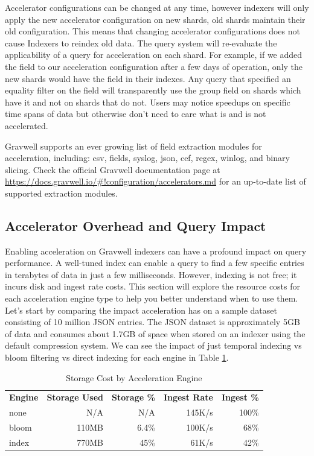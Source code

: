 {Accelerator configurations can be changed at any time, however indexers
will only apply the new accelerator configuration on new shards, old
shards maintain their old configuration. This means that changing
accelerator configurations does not cause Indexers to reindex old data.
The query system will re-evaluate the applicability of a query for
acceleration on each shard. For example, if we added the field
 to our acceleration configuration after a few days of
operation, only the new shards would have the field in their indexes.
Any query that specified an equality filter on the  field will
transparently use the group field on shards which have it and not on shards
that do not. Users may notice speedups on specific time spans of data
but otherwise don't need to care what is and is not accelerated.

Gravwell supports an ever growing list of field extraction modules for
acceleration, including: csv, fields, syslog, json, cef, regex, winlog,
and binary slicing. Check the official Gravwell documentation page at
\href{https://docs.gravwell.io/\#!configuration/accelerators.md}{https://docs.gravwell.io/\#!configuration/accelerators.md} for
an up-to-date list of supported extraction modules.

\subsection{Accelerator Overhead and Query Impact}

Enabling acceleration on Gravwell indexers can have a profound impact
on query performance. A well-tuned index can enable a query to find a
few specific entries in terabytes of data in just a few milliseconds.
However, indexing is not free; it incurs disk and ingest rate costs.
This section will explore the resource costs for each acceleration
engine type to help you better understand when to use them. Let's start
by comparing the impact acceleration has on a sample dataset consisting
of 10 million JSON entries. The JSON dataset is approximately 5GB of
data and consumes about 1.7GB of space when stored on an indexer using
the default compression system. We can see the impact of just temporal
indexing vs bloom filtering vs direct indexing for each engine in Table \ref{table:accel-storage}.

\begin{table}
\begin{tabular}{lrrrr}
	\hline
	\textbf{Engine} & \textbf{Storage Used} & \textbf{Storage \%} & \textbf{Ingest Rate} & \textbf{Ingest \%} \\
	none & N/A & N/A & 145K/s & 100\% \\
	bloom & 110MB & 6.4\% & 100K/s & 68\% \\
	index & 770MB & 45\% & 61K/s & 42\% \\
	\hline
\end{tabular}
\caption{Storage Cost by Acceleration Engine}
\label{table:accel-storage}
\end{table}

}
